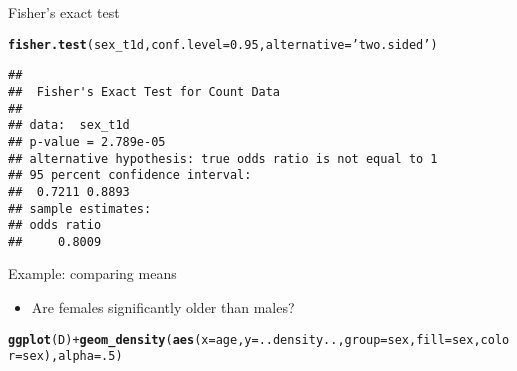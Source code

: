\documentclass{beamer}
\makeatletter
\newcommand{\hlnum}[1]{\textcolor[rgb]{0.686,0.059,0.569}{#1}}%
\newcommand{\hlstr}[1]{\textcolor[rgb]{0.192,0.494,0.8}{#1}}%
\newcommand{\hlopt}[1]{\textcolor[rgb]{0,0,0}{#1}}%
\newcommand{\hlstd}[1]{\textcolor[rgb]{0.345,0.345,0.345}{#1}}%
\newcommand{\hlkwc}[1]{\textcolor[rgb]{0.333,0.667,0.333}{#1}}%
\newcommand{\hlkwd}[1]{\textcolor[rgb]{0.737,0.353,0.396}{\textbf{#1}}}%
\newenvironment{kframe}{%
 \def\at@end@of@kframe{}%
 \ifinner\ifhmode%
  \def\at@end@of@kframe{\end{minipage}}%
  \begin{minipage}{\columnwidth}%
 \fi\fi%
 \def\FrameCommand##1{\hskip\@totalleftmargin \hskip-\fboxsep
 \colorbox{shadecolor}{##1}\hskip-\fboxsep
     \hskip-\linewidth \hskip-\@totalleftmargin \hskip\columnwidth}%
 \MakeFramed {\advance\hsize-\width
   \@totalleftmargin\z@ \linewidth\hsize
   \@setminipage}}%
 {\par\unskip\endMakeFramed%
 \at@end@of@kframe}
\newenvironment{knitrout}{}{} %
\makeatother
\begin{document}
\begin{frame}[fragile]{Fisher's exact test}
\begin{knitrout}\tiny
{}\color{fgcolor}\begin{kframe}
\begin{alltt}
\hlkwd{fisher.test}\hlstd{(sex_t1d,} \hlkwc{conf.level}\hlstd{=}\hlnum{0.95}\hlstd{,} \hlkwc{alternative}\hlstd{=}\hlstr{'two.sided'}\hlstd{)}
\end{alltt}
\begin{verbatim}
## 
## 	Fisher's Exact Test for Count Data
## 
## data:  sex_t1d
## p-value = 2.789e-05
## alternative hypothesis: true odds ratio is not equal to 1
## 95 percent confidence interval:
##  0.7211 0.8893
## sample estimates:
## odds ratio 
##     0.8009
\end{verbatim}
\end{kframe}
\end{knitrout}
\end{frame}

\begin{frame}[fragile]{Example: comparing means}
  \begin{itemize}
    \item Are females significantly older than males?
  \end{itemize}
\begin{knitrout}\tiny
{}\color{fgcolor}\begin{kframe}
\begin{alltt}
\hlkwd{ggplot}\hlstd{(D)} \hlopt{+} \hlkwd{geom_density}\hlstd{(}\hlkwd{aes}\hlstd{(}\hlkwc{x}\hlstd{=age,} \hlkwc{y}\hlstd{=..density..,} \hlkwc{group}\hlstd{=sex,} \hlkwc{fill}\hlstd{=sex,} \hlkwc{color}\hlstd{=sex),} \hlkwc{alpha}\hlstd{=}\hlnum{.5}\hlstd{)}
\end{alltt}


{\ttfamily\noindent\bfseries\color{errorcolor}{\#\# Error: ggplot2 doesn't know how to deal with data of class list}}\end{kframe}
\end{knitrout}
\end{frame}
\end{document}

